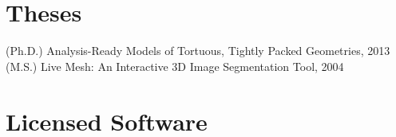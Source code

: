 \documentclass[margin,line]{res}
\begin{document}
\begin{resume}
%
%
%
%
%

\section{\sc Theses}
(Ph.D.) Analysis-Ready Models of Tortuous, Tightly Packed Geometries, 2013\\
(M.S.) Live Mesh: An Interactive 3D Image Segmentation Tool, 2004


\section{\sc Licensed Software}


\end{resume}
\end{document}
